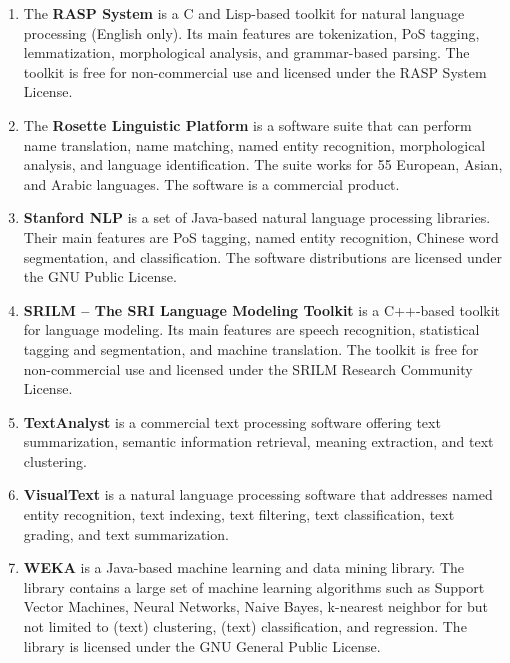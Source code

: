 \documentclass[a4paper,twoside]{book}      %
\begin{document}
\begin{enumerate}
\item The \textbf{RASP System} \cite{briscoe2006second} is a C and Lisp-based toolkit for natural language processing (English only). Its main features are tokenization, PoS tagging, lemmatization, morphological analysis, and grammar-based parsing.
The toolkit is free for non-commercial use and licensed under the RASP System License.
\item The \textbf{Rosette Linguistic Platform} \cite{rosette} is a software suite that can perform name translation, name matching, named entity recognition, morphological analysis, and language identification. The suite works for 55 European, Asian, and Arabic languages.
The software is a commercial product.
\item \textbf{Stanford NLP} \cite{stanfordnlp} is a set of Java-based natural language processing libraries. Their main features are PoS tagging, named entity recognition, Chinese word segmentation, and classification.
The software distributions are licensed under the GNU Public License.
\item \textbf{SRILM -- The SRI Language Modeling Toolkit} \cite{stolcke2002srilm} is a C++-based toolkit for language modeling. Its main features are speech recognition, statistical tagging and segmentation, and machine translation.
The toolkit is free for non-commercial use and licensed under the SRILM Research Community License.
\item \textbf{TextAnalyst} \cite{textanalyst} is a commercial text processing software offering text summarization, semantic information retrieval, meaning extraction, and text clustering.
\item \textbf{VisualText} \cite{visualtext} is a natural language processing software that addresses named entity recognition, text indexing, text filtering, text classification, text grading, and text summarization.
\item \textbf{WEKA} \cite{hall2009weka} is a Java-based machine learning and data mining library. The library contains a large set of machine learning algorithms such as Support Vector Machines, Neural Networks, Naive Bayes, k-nearest neighbor for but not limited to (text) clustering, (text) classification, and regression.
The library is licensed under the GNU General Public License.
\end{enumerate}
\end{document}
